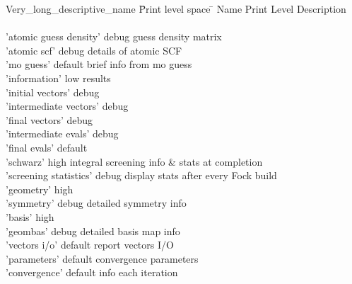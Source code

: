 \begin{tabbing}
  Very\_long\_descriptive\_name \= Print level space \= \kill
  Name                   \> Print Level \> Description \\
                         \>        \> \\
  'atomic guess density' \> debug  \> guess density matrix \\
  'atomic scf'           \> debug  \> details of atomic SCF \\
  'mo guess'             \> default\> brief info from mo guess \\
  'information'          \> low    \> results  \\
  'initial vectors'      \> debug  \> \\
  'intermediate vectors' \> debug  \> \\
  'final vectors'        \> debug  \> \\
  'intermediate evals'   \> debug  \> \\
  'final evals'          \> default\> \\
  'schwarz'              \> high   \> integral screening info \&
  stats at completion\\
  'screening statistics' \> debug  \> display stats after every Fock build \\
 'geometry'             \> high   \> \\
  'symmetry'             \> debug  \> detailed symmetry info \\
  'basis'                \> high   \> \\
  'geombas'              \> debug  \> detailed basis map info \\
  'vectors i/o'          \> default\> report vectors I/O \\
  'parameters'           \> default\> convergence parameters \\
  'convergence'          \> default\> info each iteration
\end{tabbing}
